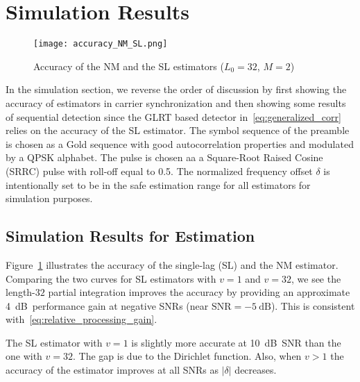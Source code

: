 \section{Simulation Results}%
\label{sec:simulations}

\begin{figure}[t]
    \centerline{\texttt{[image: accuracy\_NM\_SL.png]}}
    \caption{Accuracy of the NM and the SL estimators ($L_0=32$, $M=2$)}
    \label{fig:accuracy_NM_SL}
    \end{figure}

In the simulation section, we reverse the order of discussion by first showing 
the accuracy of estimators in carrier synchronization and then showing some results of sequential detection since
the GLRT based detector in~\eqref{eq:generalized_corr} relies on the accuracy of 
the SL estimator.
The symbol sequence of the preamble is chosen as a Gold sequence 
with good autocorrelation properties and
modulated by a QPSK alphabet.
The pulse is chosen aa a
Square-Root Raised Cosine (SRRC) pulse with roll-off equal to 0.5.
The normalized frequency offset $\delta$ is intentionally set to be in
the safe estimation range for all estimators for simulation purposes. 

\subsection{Simulation Results for Estimation}%


Figure~\ref{fig:accuracy_NM_SL} illustrates the accuracy of the single-lag (SL) and the NM estimator.
Comparing the two curves for SL estimators with $v=1$ and $v=32$, 
we see the length-$32$ partial integration
improves the accuracy by providing an approximate
\SI{4}{\dB}~performance gain at negative SNRs
(near $\text{SNR}=\SI{-5}{\dB}$). This is consistent
with~\eqref{eq:relative_processing_gain}.

The SL estimator with $v=1$ is slightly more accurate
at \SI{10}{\dB}~SNR than the one with $v=32$.
The gap is due to the Dirichlet function.
Also, when $v>1$
the accuracy of the estimator improves at all SNRs as $|\delta|$ decreases.

